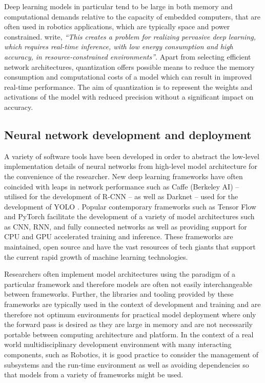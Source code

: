 \documentclass[a4paper,twoside,12pt]{report}
\begin{document}
Deep learning models in particular tend to be large in both memory and computational demands relative to the capacity of embedded computers, that are often used in robotics applications, which are typically space and power constrained. \cite{quantization} write, \textit{``This creates a problem for realizing pervasive deep learning, which requires real-time inference, with low energy consumption and high accuracy, in resource-constrained environments''}. Apart from selecting efficient network architectures, quantization offers possible means to reduce the memory consumption and computational costs of a model which can result in improved real-time performance. The aim of quantization is to represent the weights and activations of the model with reduced precision without a significant impact on accuracy. 

\subsection{Neural network development and deployment}

A variety of software tools have been developed in order to abstract the low-level implementation details of neural networks from high-level model architecture for the convenience of the researcher. New deep learning frameworks have often coincided with leaps in network performance such as Caffe (Berkeley AI) \citep{caffe} -- utilised for the development of R-CNN \citep{rcnn} -- as well as Darknet -- used for the development of YOLO \citep{yolo}. Popular contemporary frameworks such as Tensor Flow \citep{tensorflow} and PyTorch \citep{pytorch} facilitate the development of a variety of model architectures such as CNN, RNN, and fully connected networks as well as providing support for CPU and GPU accelerated training and inference. These frameworks are maintained, open source and have the vast resources of tech giants that support the current rapid growth of machine learning technologies.

Researchers often implement model architectures using the paradigm of a particular framework and therefore models are often not easily interchangeable between frameworks. Further, the libraries and tooling provided by these frameworks are typically used in the context of development and training and are therefore not optimum environments for practical model deployment where only the forward pass is desired as they are large in memory and are not necessarily portable between computing architecture and platform. In the context of a real world multidisciplinary development environment with many interacting components, such as Robotics, it is good practice to consider the management of subsystems and the run-time environment as well as avoiding dependencies so that models from a variety of frameworks might be used. 
\end{document}
